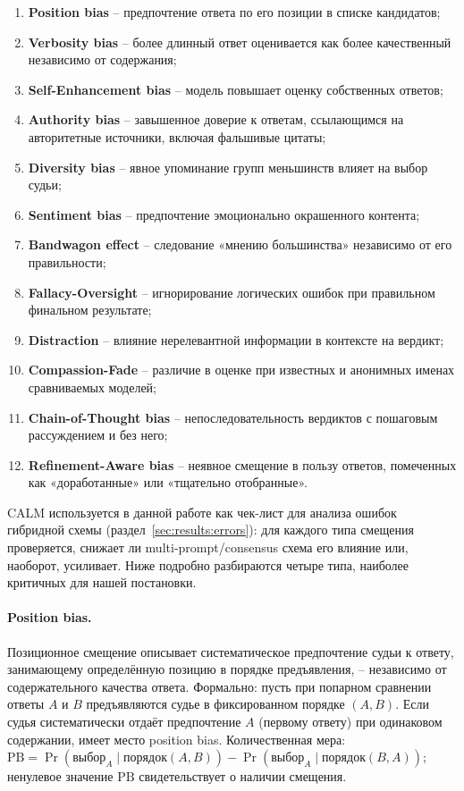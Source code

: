 \begin{enumerate}
    \item \textbf{Position bias} -- предпочтение ответа по его позиции
        в списке кандидатов;
    \item \textbf{Verbosity bias} -- более длинный ответ оценивается
        как более качественный независимо от содержания;
    \item \textbf{Self-Enhancement bias} -- модель повышает оценку
        собственных ответов;
    \item \textbf{Authority bias} -- завышенное доверие к ответам,
        ссылающимся на авторитетные источники, включая фальшивые
        цитаты;
    \item \textbf{Diversity bias} -- явное упоминание групп меньшинств
        влияет на выбор судьи;
    \item \textbf{Sentiment bias} -- предпочтение эмоционально
        окрашенного контента;
    \item \textbf{Bandwagon effect} -- следование «мнению большинства»
        независимо от его правильности;
    \item \textbf{Fallacy-Oversight} -- игнорирование логических ошибок
        при правильном финальном результате;
    \item \textbf{Distraction} -- влияние нерелевантной информации в
        контексте на вердикт;
    \item \textbf{Compassion-Fade} -- различие в оценке при известных и
        анонимных именах сравниваемых моделей;
    \item \textbf{Chain-of-Thought bias} -- непоследовательность
        вердиктов с пошаговым рассуждением и без него;
    \item \textbf{Refinement-Aware bias} -- неявное смещение в пользу
        ответов, помеченных как «доработанные» или «тщательно
        отобранные».
\end{enumerate}

CALM используется в данной работе как чек-лист для анализа ошибок
гибридной схемы (раздел~\ref{sec:results:errors}): для каждого типа
смещения проверяется, снижает ли multi-prompt/consensus схема его
влияние или, наоборот, усиливает.
Ниже подробно разбираются четыре типа, наиболее критичных для
нашей постановки.

\paragraph{Position bias.}
Позиционное смещение описывает систематическое предпочтение
судьи к ответу, занимающему определённую позицию в порядке
предъявления, -- независимо от содержательного качества ответа.
Формально: пусть при попарном сравнении ответы $A$ и $B$
предъявляются судье в фиксированном порядке $(A, B)$.
Если судья систематически отдаёт предпочтение $A$ (первому
ответу) при одинаковом содержании, имеет место position bias.
Количественная мера: $\mathrm{PB} =
\Pr(\text{выбор}_A \mid \text{порядок}(A,B)) -
\Pr(\text{выбор}_A \mid \text{порядок}(B,A))$;
ненулевое значение $\mathrm{PB}$ свидетельствует о наличии
смещения.

